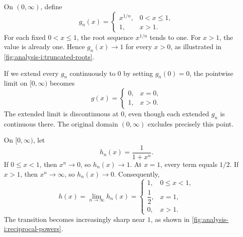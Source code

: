 \begin{example}
  \label{ex:analysis-i:truncated-roots}
  On $(0,\infty)$, define
  \[
    g_n(x)=
    \begin{cases}
      x^{1/n},&0<x\le1,\\
      1,&x>1.
    \end{cases}
  \]
  For each fixed $0<x\le1$, the root sequence $x^{1/n}$ tends to one.
  For $x>1$, the value is already one. Hence $g_n(x)\to1$ for every
  $x>0$, as illustrated in \autoref{fig:analysis-i:truncated-roots}.
\end{example}


  If we extend every $g_n$ continuously to $0$ by setting $g_n(0)=0$,
  the pointwise limit on $[0,\infty)$ becomes
  \[
    g(x)=
    \begin{cases}
      0,&x=0,\\
      1,&x>0.
    \end{cases}
  \]
  The extended limit is discontinuous at $0$, even though each extended
  $g_n$ is continuous there. The original domain $(0,\infty)$ excludes
  precisely this point.


\begin{marginfigure}
  \centering
  
  \caption[Truncated roots and their pointwise limit.]{Truncated roots for $n=2$ (gray) and $n=16$ (black),
    on the domain $x>0$. The dashed line is the limit $1$.
    The open origin is excluded from each graph.}
  \label{fig:analysis-i:truncated-roots}
\end{marginfigure}

\begin{example}
  \label{ex:analysis-i:reciprocal-powers}
  On $[0,\infty)$, let
  \[
    h_n(x)=\frac{1}{1+x^n}.
  \]
  If $0\le x<1$, then $x^n\to0$, so $h_n(x)\to1$.
  At $x=1$, every term equals $1/2$.
  If $x>1$, then $x^n\to\infty$, so $h_n(x)\to0$.
  Consequently,
  \[
    h(x)=\lim_{n\to\infty}h_n(x)=
    \begin{cases}
      1,&0\le x<1,\\
      \dfrac12,&x=1,\\
      0,&x>1.
    \end{cases}
  \]
  The transition becomes increasingly sharp near $1$, as shown in
  \autoref{fig:analysis-i:reciprocal-powers}.
\end{example}

\begin{marginfigure}
  \centering
  
  \caption[Reciprocal powers and their pointwise limit.]{Reciprocal powers for $n=2$ (gray) and $n=16$ (black).
    The dashed graph is the pointwise limit. All curves pass through
    $(1,1/2)$, which remains the limit's value at $1$.}
  \label{fig:analysis-i:reciprocal-powers}
\end{marginfigure}
